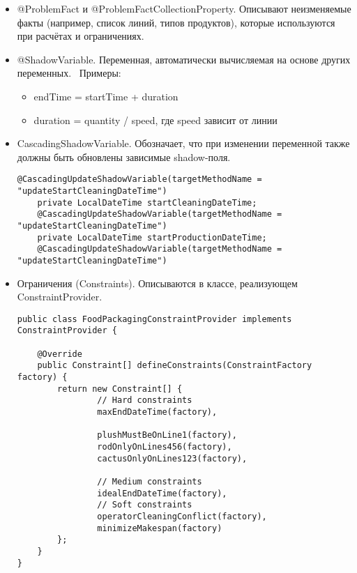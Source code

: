 \begin{itemize}
\item @ProblemFact и @ProblemFactCollectionProperty. Описывают неизменяемые факты (например, список линий, типов продуктов), которые используются при расчётах и ограничениях.

\item @ShadowVariable. Переменная, автоматически вычисляемая на основе других переменных. \
Примеры:
\begin{itemize}
    \item endTime = startTime + duration
    \item duration = quantity / speed, где speed зависит от линии
\end{itemize}

\item CascadingShadowVariable. Обозначает, что при изменении переменной также должны быть обновлены зависимые shadow-поля.
\begin{lstlisting}[caption={каскадные теневые переменные в классе Job}, label={lst:fcProvider}]
@CascadingUpdateShadowVariable(targetMethodName = "updateStartCleaningDateTime")
    private LocalDateTime startCleaningDateTime;
    @CascadingUpdateShadowVariable(targetMethodName = "updateStartCleaningDateTime")
    private LocalDateTime startProductionDateTime;
    @CascadingUpdateShadowVariable(targetMethodName = "updateStartCleaningDateTime")
\end{lstlisting}

\vspace{6cm}
\item Ограничения (Constraints). Описываются в классе, реализующем ConstraintProvider.
\begin{lstlisting}[caption={класс FoodPackagingConstraintProvider}, label={lst:fcProvider}]
public class FoodPackagingConstraintProvider implements ConstraintProvider {

    @Override
    public Constraint[] defineConstraints(ConstraintFactory factory) {
        return new Constraint[] {
                // Hard constraints
                maxEndDateTime(factory),

                plushMustBeOnLine1(factory),
                rodOnlyOnLines456(factory),
                cactusOnlyOnLines123(factory),

                // Medium constraints
                idealEndDateTime(factory),
                // Soft constraints
                operatorCleaningConflict(factory),
                minimizeMakespan(factory)
        };
    }
}
\end{lstlisting}
\end{itemize}


